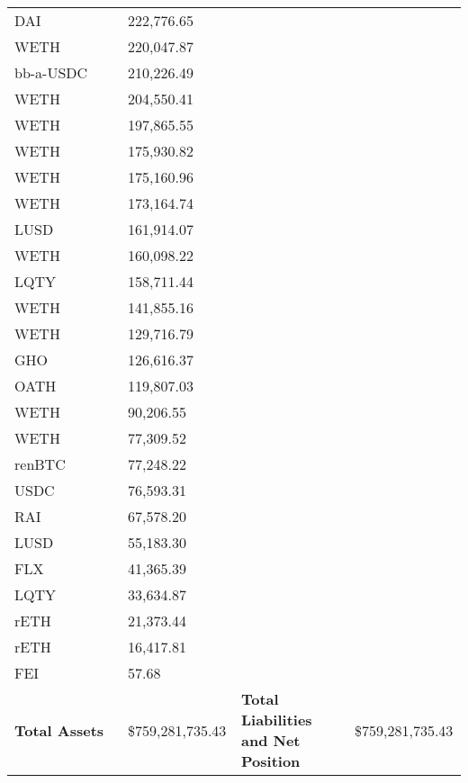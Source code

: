 \begin{longtable}{@{}p{0.25\linewidth}p{0.25\linewidth}p{0.25\linewidth}p{0.25\linewidth}@{}}
DAI & 222,776.65 & & \\
WETH & 220,047.87 & & \\
bb-a-USDC & 210,226.49 & & \\
WETH & 204,550.41 & & \\
WETH & 197,865.55 & & \\
WETH & 175,930.82 & & \\
WETH & 175,160.96 & & \\
WETH & 173,164.74 & & \\
LUSD & 161,914.07 & & \\
WETH & 160,098.22 & & \\
LQTY & 158,711.44 & & \\
WETH & 141,855.16 & & \\
WETH & 129,716.79 & & \\
GHO & 126,616.37 & & \\
OATH & 119,807.03 & & \\
WETH & 90,206.55 & & \\
WETH & 77,309.52 & & \\
renBTC & 77,248.22 & & \\
USDC & 76,593.31 & & \\
RAI & 67,578.20 & & \\
LUSD & 55,183.30 & & \\
FLX & 41,365.39 & & \\
LQTY & 33,634.87 & & \\
rETH & 21,373.44 & & \\
rETH & 16,417.81 & & \\
FEI & 57.68 & & \\

\midrule

\textbf{Total Assets} & \$759,281,735.43 & \textbf{Total Liabilities and Net Position} & \$759,281,735.43 \\

\bottomrule

\end{longtable}
